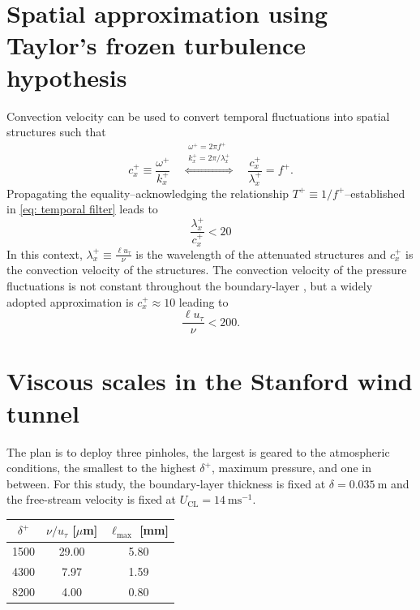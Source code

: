 \documentclass[11pt,a4paper]{article}
\begin{document}
\section{Spatial approximation using Taylor's frozen turbulence hypothesis}

    Convection velocity can be used to convert temporal fluctuations into spatial structures such that
    \begin{equation}
        c_x^+ \equiv \frac{\omega^+}{k_x^+} \quad \overset{\substack{\omega^+=2\pi f^+\\ k_x^+=2\pi/\lambda_x^+}}{\Longleftrightarrow} \quad \frac{c_x^+}{\lambda_x^+}=f^+ .
    \end{equation}
    Propagating the equality--acknowledging the relationship $T^+\equiv1/f^+$--established in \eqref{eq: temporal filter} leads to
    \begin{equation}
        \frac{\lambda_x^+}{c_x^+}<20
    \end{equation}
    In this context, $\lambda_x^+ \equiv \frac{\ell u_\tau}{\nu}$ is the wavelength of the attenuated structures and $c_x^+$ is the convection velocity of the structures. The convection velocity of the pressure fluctuations is not constant throughout the boundary-layer \citep{willmarth_measurements_1962,corcos_structure_1964}, but a widely adopted approximation is $c_x^+\approx 10$ leading to
    \begin{equation}
        \boxed{\frac{\ell u_\tau}{\nu} < 200.}
    \end{equation}

\section{Viscous scales in the Stanford wind tunnel}

    The plan is to deploy three pinholes, the largest is geared to the atmospheric conditions, the smallest to the highest $\delta^+$, maximum pressure, and one in between. For this study, the boundary-layer thickness is fixed at $\delta = 0.035~\mathrm{m}$ and the free-stream velocity is fixed at $U_{\mathrm{CL}} = 14~\mathrm{ms}^{-1}$.
    
    \begin{table}[H]
        \centering
        \begin{tabular}{c c c}
            $\delta^+$ & $\nu/u_\tau$ [$\mu$m] & $\ell_{\max}$ [mm] \\
            \hline
            1500 & 29.00 & 5.80 \\
            4300 & 7.97 & 1.59 \\
            8200 & 4.00 & 0.80 \\
        \end{tabular}
    \label{tab:stanford}
    \end{table}






\end{document}
